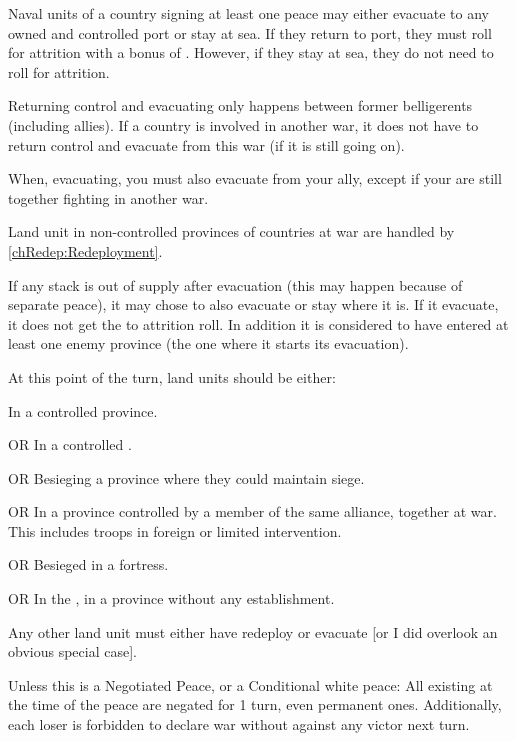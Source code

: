  Naval units of a country signing at least one peace
may either evacuate to any owned and controlled port or stay at sea.
\bparag If they return to port, they must roll for attrition with a bonus of
.
\bparag However, if they stay at sea, they do not need to roll for attrition.

\begin{designnote}
  Returning control and evacuating only happens between former belligerents
  (including allies). If a country is involved in another war, it does not
  have to return control and evacuate from this war (if it is still going
  on).

  When, evacuating, you must also evacuate from your ally, except if your are
  still together fighting in another war.
  
  Land unit in non-controlled provinces of countries at war are handled by
  \ref{chRedep:Redeployment}.
\end{designnote}

 If any stack is out of supply after
evacuation (this may happen because of separate peace), it may chose to also
evacuate or stay where it is.
\bparag If it evacuate, it does not get the  to attrition roll. In
addition it is considered to have entered at least one enemy province (the one
where it starts its evacuation).

\aparag[Memento]
\bparag At this point of the turn, land units should be either:
\begin{modlist}
\item In a controlled province.
\item[OR] In a controlled \Presidio.
\item[OR] Besieging a province where they could maintain siege.
\item[OR] In a province controlled by a member of the same alliance, together
  at war. This includes troops in foreign or limited intervention.
\item[OR] Besieged in a fortress.
\item[OR] In the \ROTW, in a province without any establishment.
\end{modlist}
\bparag Any other land unit must either have redeploy or evacuate [or I did
overlook an obvious special case].

\aparag[Pacification] Unless this is a Negotiated Peace, or a Conditional
white peace:
\bparag All existing \CB at the time of the peace are negated for 1 turn, even
permanent ones.
\bparag Additionally, each loser is forbidden to declare war without \CB
against any victor next turn.


